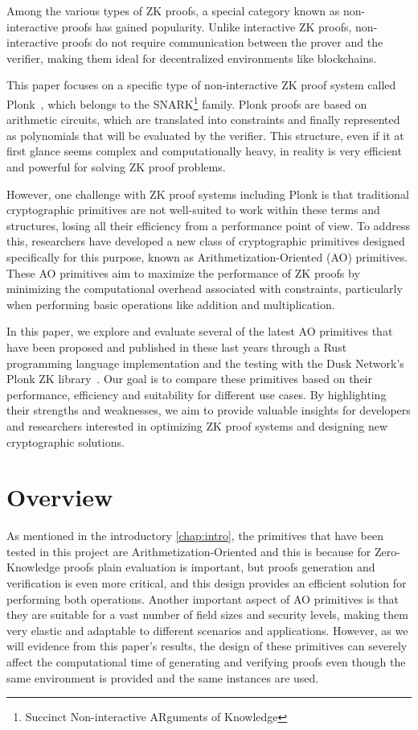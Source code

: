 \documentclass[12pt, a4paper]{report}
\begin{document}
Among the various types of ZK proofs, a special category known as non-interactive proofs has gained popularity.
Unlike interactive ZK proofs, non-interactive proofs do not require communication between the prover and the verifier, making them ideal for decentralized environments like blockchains.

This paper focuses on a specific type of non-interactive ZK proof system called \textsf{Plonk}~\cite{plonk}, which belongs to the SNARK\footnote{Succinct Non-interactive ARguments of Knowledge} family.
\textsf{Plonk} proofs are based on arithmetic circuits, which are translated into constraints and finally represented as polynomials that will be evaluated by the verifier.
This structure, even if it at first glance seems complex and computationally heavy, in reality is very efficient and powerful for solving ZK proof problems.

However, one challenge with ZK proof systems including \textsf{Plonk} is that traditional cryptographic primitives are not well-suited to work within these terms and structures, losing all their efficiency from a performance point of view.
To address this, researchers have developed a new class of cryptographic primitives designed specifically for this purpose, known as Arithmetization-Oriented (AO) primitives.
These AO primitives aim to maximize the performance of ZK proofs by minimizing the computational overhead associated with constraints, particularly when performing basic operations like addition and multiplication.

In this paper, we explore and evaluate several of the latest AO primitives that have been proposed and published in these last years through a Rust programming language implementation and the testing with the Dusk Network's \textsf{Plonk} ZK library~\cite{dusk-plonk}.
Our goal is to compare these primitives based on their performance, efficiency and suitability for different use cases.
By highlighting their strengths and weaknesses, we aim to provide valuable insights for developers and researchers interested in optimizing ZK proof systems and designing new cryptographic solutions.

\chapter{Overview}\label{chap:overview}

As mentioned in the introductory \autoref{chap:intro}, the primitives that have been tested in this project are Arithmetization-Oriented and this is because for Zero-Knowledge proofs plain evaluation is important, but proofs generation and verification is even more critical, and this design provides an efficient solution for performing both operations.
Another important aspect of AO primitives is that they are suitable for a vast number of field sizes and security levels, making them very elastic and adaptable to different scenarios and applications.
However, as we will evidence from this paper's results, the design of these primitives can severely affect the computational time of generating and verifying proofs even though the same environment is provided and the same instances are used.
\end{document}
